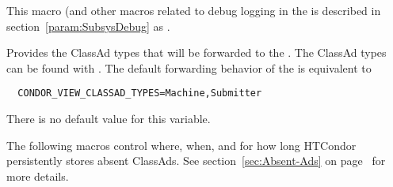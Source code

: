 \begin{description}
\label{param:CollectorDebug}
\item[\Macro{COLLECTOR\_DEBUG}]
  This macro (and other macros related to debug logging in the 
  is described in section~\ref{param:SubsysDebug} as
  .

\label{param:CondorViewClassadTypes}
\item[\Macro{CONDOR\_VIEW\_CLASSAD\_TYPES}]
  Provides the ClassAd types that will be forwarded to the
  . The ClassAd types can be found with 
   . The default forwarding behavior of the 
   is equivalent to 
\begin{verbatim}
  CONDOR_VIEW_CLASSAD_TYPES=Machine,Submitter
\end{verbatim} 
  There is no default value for this variable.

\end{description}

The following macros control where, when, and for how long HTCondor 
persistently stores absent ClassAds.
See section~\ref{sec:Absent-Ads} on 
page~\pageref{sec:Absent-Ads} for more details.

